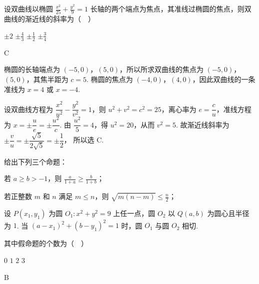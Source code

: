\begin{problem}
设双曲线以椭圆 \(\frac{x^2}{25} + \frac{y^2}{9} = 1\) 长轴的两个端点为焦点，其准线过椭圆的焦点，则双曲线的渐近线的斜率为（\(\quad\)）

\choices
    {\(\pm 2\)}
    {\(\pm \frac{4}{3}\)}
    {\(\pm \frac{1}{2}\)}
    {\(\pm \frac{3}{4}\)}
\end{problem}

\begin{answer}
C
\end{answer}

\begin{solution}
椭圆的长轴端点为 \((-5,0)\)，\((5,0)\)，所以所求双曲线的焦点为 \((-5,0)\)，\((5,0)\)，其焦半距为 \(c=5\). 椭圆的焦点为 \((-4,0)\)，\((4,0)\)，因此双曲线的一条准线为 \(x=4\) 或 \(x=-4\).

设双曲线方程为 \(\dfrac{x^2}{u^2}-\dfrac{y^2}{v^2}=1\)，则 \(u^2+v^2=c^2=25\)，离心率为 \(e=\dfrac{c}{u}\)，准线方程为 \(x=\pm\dfrac{u}{e}=\pm\dfrac{u^2}{c}\). 由 \(\dfrac{u^2}{5}=4\)，得 \(u^2=20\)，从而 \(v^2=5\). 故渐近线斜率为
\(\pm\dfrac{v}{u}=\pm\dfrac{\sqrt{5}}{2\sqrt{5}}=\pm\dfrac{1}{2}\)，
所以选 C.
\end{solution}

\begin{problem}
给出下列三个命题：

\begin{circlelist}
\item 若 \(a \geqslant b > -1\)，则 \(\frac{a}{1 + a} \geqslant \frac{b}{1 + b}\)；
\item 若正整数 \(m\) 和 \(n\) 满足 \(m \leqslant n\)，则 \(\sqrt{m(n - m)} \leqslant \frac{n}{2}\)；
\item 设 \(P(x_{1}, y_{1})\) 为圆 \(O_{1}: x^{2} + y^{2} = 9\) 上任一点，圆 \(O_{2}\) 以 \(Q(a, b)\) 为圆心且半径为 \(1\). 当 \((a - x_{1})^{2} + (b - y_{1})^{2} = 1\) 时，圆 \(O_{1}\) 与圆 \(O_{2}\) 相切.
\end{circlelist}

其中假命题的个数为（\(\quad\)）

\choices
    {\(0\)}
    {\(1\)}
    {\(2\)}
    {\(3\)}
\end{problem}

\begin{answer}
B
\end{answer}

